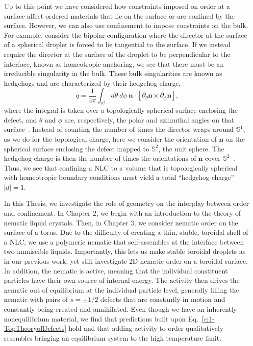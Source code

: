 Up to this point we have considered how constraints imposed on order at a surface affect ordered materials that lie on the surface or are confined by the surface.
However, we can also use confinement to impose constraints on the bulk.
For example, consider the bipolar configuration where the director at the surface of a spherical droplet is forced to lie tangential to the surface.
If we instead require the director at the surface of the droplet to be perpendicular to the interface, known as homeotropic anchoring, we see that there must be an irreducible singularity in the bulk.
These bulk singularities are known as hedgehogs and are characterized by their hedgehog charge,
\begin{equation}
  q = \frac{1}{4 \pi} \int_{\mathbb{S}^2} d\theta \: d\phi \: \mathbf{n} \cdot \left [ \partial_{\theta} \mathbf{n} \times \partial_{\phi} \mathbf{n} \right ],\label{e:1-HedgehogCharge}
\end{equation}
where the integral is taken over a topologically spherical surface enclosing the defect, and $\theta$ and $\phi$ are, respectively, the polar and azimuthal angles on that surface~\cite{RN153}.
Instead of counting the number of times the director wraps around $\mathbb{S}^1$, as we do for the topological charge, here we consider the orientation of $\mathbf{n}$ on the spherical surface enclosing the defect mapped to $\mathbb{S}^2$, the unit sphere.
The hedgehog charge is then the number of times the orientations of $\mathbf{n}$ cover $\mathbb{S}^2$~\cite{RN153}.
Thus, we see that confining a NLC to a volume that is topologically spherical with homeotropic boundary conditions must yield a total ``hedgehog charge'' $|d|=1$.

In this Thesis, we investigate the role of geometry on the interplay between order and confinement.
In Chapter 2, we begin with an introduction to the theory of nematic liquid crystals.
Then, in Chapter 3, we consider nematic order on the surface of a torus.
Due to the difficulty of creating a thin, stable, toroidal shell of a NLC, we use a polymeric nematic that self-assembles at the interface between two immiscible liquids.
Importantly, this lets us make stable toroidal droplets as in our previous work, yet still investigate 2D nematic order on a toroidal surface.
In addition, the nematic is active, meaning that the individual constituent particles have their own source of internal energy.
The activity then drives the nematic out of equilibrium at the individual particle level, generally filling the nematic with pairs of $s = \pm 1/2$ defects that are constantly in motion and constantly being created and annihilated.
Even though we have an inherently nonequilibrium material, we find that predictions built upon Eq.~\ref{e:1-TopTheoryofDefects} hold and that adding activity to order qualitatively resembles bringing an equilibrium system to the high temperature limit.

